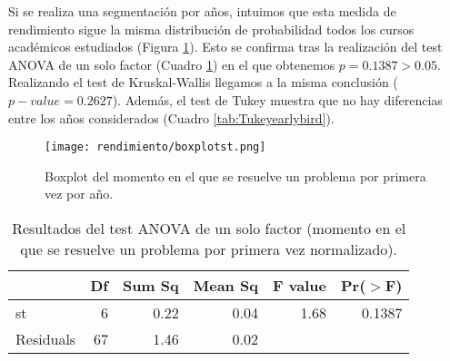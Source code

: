 Si se realiza una segmentación por años, intuimos que esta medida de rendimiento sigue la misma distribución de probabilidad todos los cursos académicos estudiados (Figura \ref{fig:boxplotearlybird}). Esto se confirma tras la realización del test ANOVA de un solo factor (Cuadro \ref{tab:ANOVAearlybird}) en el que obtenemos $p = 0.1387 > 0.05$. Realizando el test de Kruskal-Wallis llegamos a la misma conclusión ($p-value = 0.2627$). Además, el test de Tukey muestra que no hay diferencias entre los años considerados (Cuadro \ref{tab:Tukeyearlybird}).

\begin{figure}[H]
    \centering
    \texttt{[image: rendimiento/boxplotst.png]}
    \caption{Boxplot del momento en el que se resuelve un problema por primera vez por año.}
    \label{fig:boxplotearlybird}
\end{figure}

\begin{table}[H]
\centering
\caption{Resultados del test ANOVA de un solo factor (momento en el que se resuelve un problema por primera vez normalizado).}
\label{tab:ANOVAearlybird}
\begin{tabular}{lrrrrr}
  \hline
 & Df & Sum Sq & Mean Sq & F value & Pr($>$F) \\ 
  \hline
st & 6 & 0.22 & 0.04 & 1.68 & 0.1387 \\ 
  Residuals            & 67 & 1.46 & 0.02 &  &  \\ 
   \hline
\end{tabular}
\end{table}

